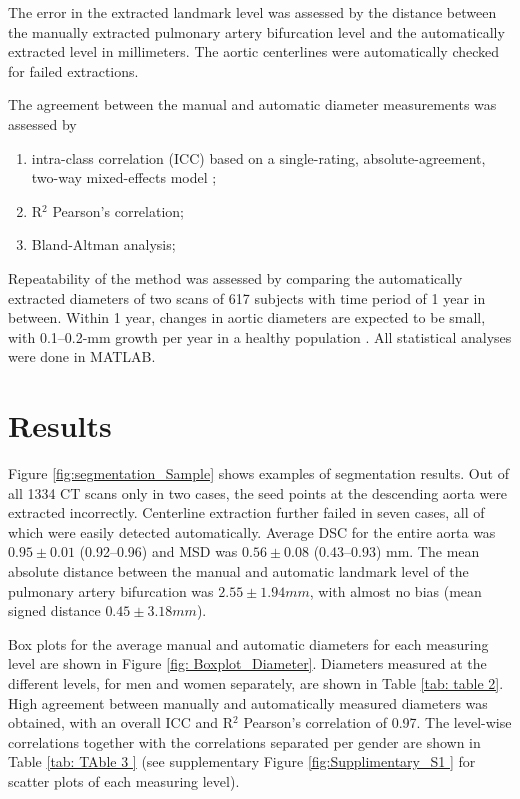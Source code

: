 The error in the extracted landmark level was assessed by the distance between the manually extracted pulmonary artery bifurcation level and the automatically extracted level in millimeters. The aortic centerlines were automatically checked for failed extractions.

The agreement between the manual and automatic diameter measurements was assessed by 
\begin{enumerate}
\item intra-class correlation (ICC) based on a single-rating, absolute-agreement, two-way mixed-effects model \autocite{koo2016guideline}; 
\item R$^2$ Pearson’s correlation;
\item Bland-Altman analysis;
\end{enumerate}

Repeatability of the method was assessed by comparing the automatically extracted diameters of two scans of 617 subjects with time period of 1 year in between. Within 1 year, changes in aortic diameters are expected to be small, with 0.1–0.2-mm growth per year in a healthy population \autocite{kalsch2013body, davies2006novel}. All statistical analyses were done in MATLAB.



\section{Results}
Figure \cref{fig:segmentation_Sample} shows examples of segmentation results. Out of all 1334 CT scans only in two cases, the seed points at the descending aorta were extracted incorrectly. Centerline extraction further failed in seven cases, all of which were easily detected automatically. Average DSC for the entire aorta was $0.95 \pm 0.01$ (0.92–0.96) and MSD was $0.56 \pm 0.08$ (0.43–0.93) mm. The mean absolute distance between the manual and automatic landmark level of the pulmonary artery bifurcation was $2.55 \pm 1.94 mm$, with almost no bias (mean signed distance $0.45 \pm 3.18 mm$).


Box plots for the average manual and automatic diameters for each measuring level are shown in Figure \cref{fig: Boxplot_Diameter}. Diameters measured at the different levels, for men and women separately, are shown in Table \cref{tab: table 2}. High agreement between manually and automatically measured diameters was obtained, with an overall ICC and R$^2$ Pearson’s correlation of 0.97. The level-wise correlations together with the correlations separated per gender are shown in Table \cref{tab: TAble 3 } (see supplementary Figure \cref{fig:Supplimentary_S1 } for scatter plots of each measuring level).

